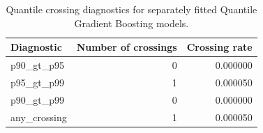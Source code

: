 \begin{table}
\caption{Quantile crossing diagnostics for separately fitted Quantile Gradient Boosting models.}
\label{tab:08-quantile-crossing-summary}
\begin{tabular}{lrr}
\toprule
Diagnostic & Number of crossings & Crossing rate \\
\midrule
p90_gt_p95 & 0 & 0.000000 \\
p95_gt_p99 & 1 & 0.000050 \\
p90_gt_p99 & 0 & 0.000000 \\
any_crossing & 1 & 0.000050 \\
\bottomrule
\end{tabular}
\end{table}
